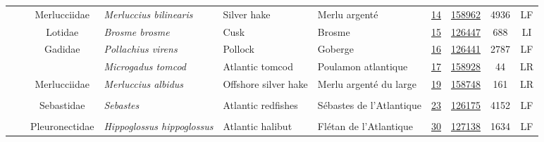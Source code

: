 \documentclass[12pt]{article}\usepackage[]{graphicx}\usepackage[]{color}
\begin{document}
\begin{landscapepage}
\begin{longtable}[t]{ccc>{\centering\arraybackslash}p{3cm}>{\centering\arraybackslash}p{3cm}>{\centering\arraybackslash}p{3cm}>{}c>{}ccc}
\nopagebreak
\hspace{1em}\hspace{1em} &  & Merlucciidae & \em{Merluccius bilinearis} & Silver hake & Merlu argenté & \href{#sec:14}{14} & \href{http://www.marinespecies.org/aphia.php?p=taxdetails&id=158962}{158962} & 4936 & LF\\
\nopagebreak
\hspace{1em}\hspace{1em} &  & Lotidae & \em{Brosme brosme} & Cusk & Brosme & \href{#sec:15}{15} & \href{http://www.marinespecies.org/aphia.php?p=taxdetails&id=126447}{126447} & 688 & LI\\
\nopagebreak
\hspace{1em}\hspace{1em} &  & Gadidae & \em{Pollachius virens} & Pollock & Goberge & \href{#sec:16}{16} & \href{http://www.marinespecies.org/aphia.php?p=taxdetails&id=126441}{126441} & 2787 & LF\\
\nopagebreak
\hspace{1em}\hspace{1em} &  &  & \em{Microgadus tomcod} & Atlantic tomcod & Poulamon atlantique & \href{#sec:17}{17} & \href{http://www.marinespecies.org/aphia.php?p=taxdetails&id=158928}{158928} & 44 & LR\\
\nopagebreak
\hspace{1em}\hspace{1em} &  & Merlucciidae & \em{Merluccius albidus} & Offshore silver hake & Merlu argenté du large & \href{#sec:19}{19} & \href{http://www.marinespecies.org/aphia.php?p=taxdetails&id=158748}{158748} & 161 & LR\\
\nopagebreak
\addlinespace[0.3em]
\\
\hspace{1em}\hspace{1em} &  & Sebastidae & \em{Sebastes} & Atlantic redfishes & Sébastes de l'Atlantique & \href{#sec:23}{23} & \href{http://www.marinespecies.org/aphia.php?p=taxdetails&id=126175}{126175} & 4152 & LF\\
\nopagebreak
\addlinespace[0.3em]
\\
\hspace{1em}\hspace{1em} &  & Pleuronectidae & \em{Hippoglossus hippoglossus} & Atlantic halibut & Flétan de l'Atlantique & \href{#sec:30}{30} & \href{http://www.marinespecies.org/aphia.php?p=taxdetails&id=127138}{127138} & 1634 & LF\\

\end{longtable}
\end{landscapepage}
\end{document}
